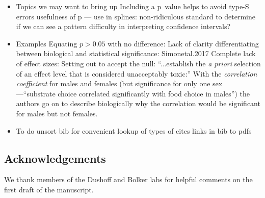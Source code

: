 \begin{itemize}
  \item Topics we may want to bring up
	  \subitem Including a p~value helps to avoid type-S errors
      \subitem usefulness of p --- use in splines: non-ridiculous standard to determine if we can see a pattern
      \subitem difficulty in interpreting confidence intervals?
\end{itemize}

\begin{itemize}
  \item Examples
  \subitem Equating $p > 0.05$ with no difference: \citep{Ortegoetal.2007, Bukovinszkyetal.2017, Singhetal.2017, Sundinetal.2017}
  \subitem Lack of clarity differentiating between biological and statistical significance: {Simonetal.2017}
  \subitem Complete lack of effect sizes: \citep{Juriadoetal.2017}
  \subitem Setting out to accept the null: \citep{Karulinetal.2015}
  \subitem ``...establish the \emph{a priori} selection of an effect level that is considered unacceptably toxic:'' \citep{Dentonetal.2011}
  \subitem With the \emph{correlation coefficient} for males and females (but significance for only one sex---``substrate 
  choice correlated significantly with food choice in males'') the authors go on to describe biologically why the 
  correlation would be significant for males but not females.
\citep{MerilaitaandJormalainen1997}
\end{itemize}

\begin{itemize}
  \item To do
  	\subitem unsort bib for convenient lookup of types of cites
    \subitem links in bib to pdfs
\end{itemize}

\subsection*{Acknowledgements}

We thank members of the Dushoff and Bolker labs for helpful comments on the first draft of the manuscript.


